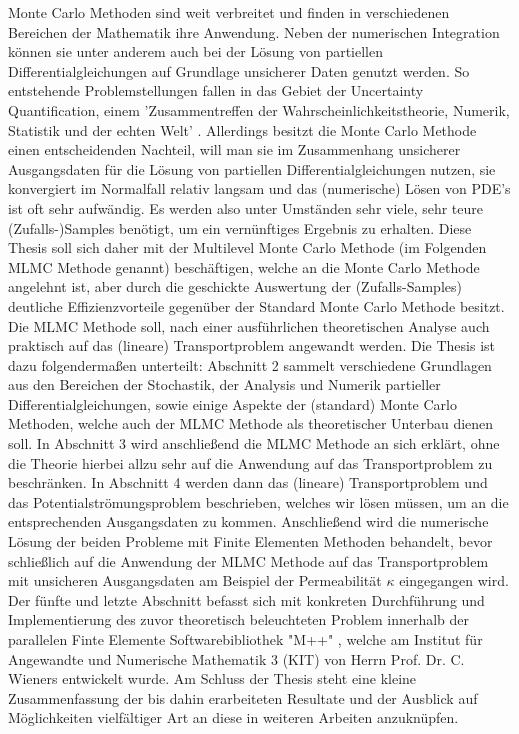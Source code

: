 \documentclass[12pt,a4paper]{scrartcl}
\numberwithin{equation}{section}
\begin{document}
Monte Carlo Methoden sind weit verbreitet und finden in verschiedenen Bereichen der Mathematik ihre Anwendung.
Neben der numerischen Integration können sie unter anderem auch bei der Lösung von partiellen Differentialgleichungen auf Grundlage unsicherer Daten genutzt werden.
So entstehende Problemstellungen fallen in das Gebiet der Uncertainty Quantification, einem 'Zusammentreffen der Wahrscheinlichkeitstheorie, Numerik, Statistik und der echten Welt' \cite{sullivan2015introduction}.
Allerdings besitzt die Monte Carlo Methode einen entscheidenden Nachteil, will man sie im Zusammenhang unsicherer Ausgangsdaten für die Lösung von partiellen Differentialgleichungen nutzen, sie konvergiert im Normalfall relativ langsam und das (numerische) Lösen von PDE's ist oft sehr aufwändig.
Es werden also unter Umständen sehr viele, sehr teure (Zufalls-)Samples benötigt, um ein vernünftiges Ergebnis zu erhalten. \newline
Diese Thesis soll sich daher mit der Multilevel Monte Carlo Methode (im Folgenden MLMC Methode genannt) beschäftigen, welche an die Monte Carlo Methode angelehnt ist, aber durch die geschickte Auswertung der (Zufalls-Samples) deutliche Effizienzvorteile gegenüber der Standard Monte Carlo Methode besitzt.
Die MLMC Methode soll, nach einer ausführlichen theoretischen Analyse auch praktisch auf das (lineare) Transportproblem angewandt werden. \newline
Die Thesis ist dazu folgendermaßen unterteilt: 
Abschnitt 2 sammelt verschiedene Grundlagen aus den Bereichen der Stochastik, der Analysis und Numerik partieller Differentialgleichungen, sowie einige Aspekte der (standard) Monte Carlo Methoden, welche auch der MLMC Methode als theoretischer Unterbau dienen soll. \newline
In Abschnitt 3 wird anschließend die MLMC Methode an sich erklärt, ohne die Theorie hierbei allzu sehr auf die Anwendung auf das Transportproblem zu beschränken. \newline
In Abschnitt 4 werden dann das (lineare) Transportproblem und das Potentialströmungsproblem beschrieben, welches wir lösen müssen, um an die entsprechenden Ausgangsdaten zu kommen. Anschließend wird die numerische Lösung der beiden Probleme mit Finite Elementen Methoden behandelt, bevor schließlich auf die Anwendung der MLMC Methode auf das Transportproblem mit unsicheren Ausgangsdaten am Beispiel der Permeabilität $\kappa$ eingegangen wird. \newline
Der fünfte und letzte Abschnitt befasst sich mit konkreten Durchführung und Implementierung des zuvor theoretisch beleuchteten Problem innerhalb der parallelen Finte Elemente Softwarebibliothek "M++" \cite{siteM++},
welche am Institut für Angewandte und Numerische Mathematik 3 (KIT) von Herrn Prof. Dr. C. Wieners entwickelt wurde. \newline
Am Schluss der Thesis steht eine kleine Zusammenfassung der bis dahin erarbeiteten Resultate und der Ausblick auf Möglichkeiten vielfältiger Art an diese in weiteren Arbeiten anzuknüpfen.
\end{document}
